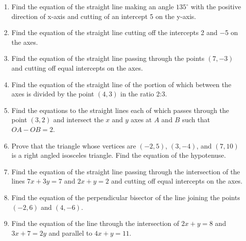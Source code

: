 \documentclass[a4paper,10pt]{article}
\begin{document}
\begin{enumerate}

\item
Find the equation of the straight line making an angle $135^{\circ}$ with the positive direction of x-axis and cutting of an intercept 5 on the y-axis.

\item
Find the equation of the straight line cutting off the intercepts 2 and −5 on the axes.

\item
Find the equation of the straight line passing through the points $(7, −3)$ and cutting off equal intercepts on the axes.

\item
Find the equation of the straight line of the portion of which between the axes is divided by the point $(4, 3)$ in the ratio 2:3.

\item
Find the equations to the straight lines each of which passes through the point $(3, 2)$ and intersect the $x$ and $y$ axes at $A$ and $B$ such that $OA - OB = 2$.

\item
Prove that the triangle whose vertices are $(−2, 5)$, $(3, −4)$, and $(7, 10)$ is a right angled isosceles triangle. Find the equation of the hypotenuse.

\item
Find the equation of the straight line passing through the intersection of the lines $7x + 3y = 7$ and $2x + y = 2$ and cutting off equal intercepts on the axes.

\item
Find the equation of the perpendicular bisector of the line joining the points $(−2, 6)$ and $(4, −6)$.

\item
Find the equation of the line through the intersection of $2x + y = 8$ and $3x + 7 = 2y$ and parallel to $4x + y = 11$.


\end{enumerate}
\end{document}
